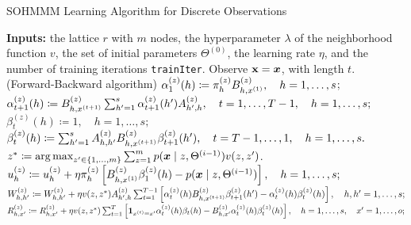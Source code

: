 \begin{algorithm}
	\caption{SOHMMM Learning Algorithm for Discrete Observations \cite{Ferles2008}}
	\label{alg:sohmmm_discrete}
	
	\begin{algorithmic}[1]
		\State \textbf{Inputs:} the lattice $r$ with $m$ nodes, the hyperparameter $\lambda$ of the neighborhood function $v$, the set of initial parameters $\Theta^{(0)}$, the learning rate $\eta$, and the number of training iterations \texttt{trainIter}.
		\vspace{0.3cm}
		\vspace{0.3cm}
		\State Observe ${\mathbf{x}} = {\bm{x}}$, with length $t$.
		\vspace{0.3cm}
		 $\quad$(Forward-Backward algorithm)
		\vspace{0.3cm}
		\State $ \alpha_1^{(z)}(h) \coloneqq \pi_{h}^{(z)}{B}^{(z)}_{h,x^{(1)}}, \quad h = 1, \dots, s$;
		\vspace{0.3cm}
		\State $ \alpha_{t+1}^{(z)}(h) \coloneqq {B}^{(z)}_{h,x^{(t+1)}} \sum_{h'=1}^{s}\alpha_{t+1}^{(z)}(h'){A}^{(z)}_{h',h}, \quad t = 1, \dots, T-1, \quad h = 1, \dots, s;$
		\vspace{0.3cm}
		\State $ \beta_{t}^{(z)}(h) \coloneqq 1, \quad h = 1, \dots, s;$
		\vspace{0.3cm}
		\State $ \beta_{t}^{(z)}(h) \coloneqq \sum_{h'=1}^{s}{A}^{(z)}_{h,h'}{B}^{(z)}_{h,x^{(t+1)}}\beta_{t+1}^{(z)}(h'), \quad t = T-1, \dots,  1, \quad h = 1, \dots, s. $
		\vspace{0.3cm}
		\EndFor
		\vspace{0.3cm}
		\State $z^* \coloneqq  \operatorname*{arg\,max}_{z' \in \{1,\dots,m\}} \sum_{z=1}^m p({\bm{x}} \mid z, \Theta^{(i-1)})v(z, z')$.
		\vspace{0.3cm}
		\vspace{0.3cm}
		\State $ {u}_h^{(z)} \coloneqq {u}_h^{(z)} + \eta  {\pi}_h^{(z)} \left[ {B}^{(z)}_{h,x^{(1)}} \beta_{1}^{(z)}(h) - p({\bm{x}} \mid z, \Theta^{(i-1)}) \right], \quad h = 1, \dots, s;$
		\vspace{0.3cm}
		\State $ {W}^{(z)}_{h,h'} \coloneqq  {W}^{(z)}_{h,h'} + \eta v(z,z^*) {A}^{(z)}_{h',h}\sum_{t=1}^{T-1}\left[\alpha_{t}^{(z)}(h) {B}^{(z)}_{h,x^{(t+1)}}\beta_{t+1}^{(z)}(h') - \alpha_{t}^{(z)}(h)\beta_{t}^{(z)}(h) \right], \quad h,h' = 1, \dots, s; $
		\vspace{0.3cm}
		\State $ {R}^{(z)}_{h,x'} \coloneqq {R}^{(z)}_{h,x'} + \eta v(z,z^*) \sum_{t=1}^{T}\left[\bm{1}_{x^{(t)}=x'}\alpha_{t}^{(z)}(h)\beta_{t}(h) - {B}^{(z)}_{h,x'}\alpha_{t}^{(z)}(h)\beta_{t}^{(z)}(h) \right], \quad h = 1, \dots, s, \quad x' = 1,\dots,o;$

\end{algorithmic}
\end{algorithm}
